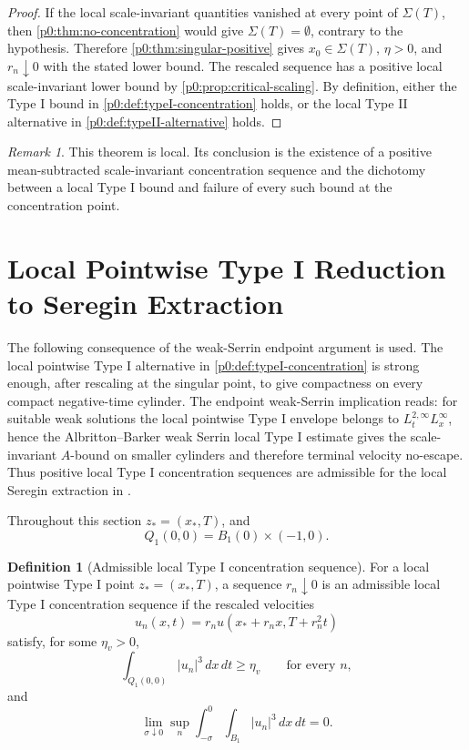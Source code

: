 \documentclass[11pt]{amsart}
\theoremstyle{plain}
\theoremstyle{definition}
\newtheorem{definition}[definition]{Definition}
\theoremstyle{remark}
\newtheorem{remark}[remark]{Remark}
\numberwithin{equation}{section}
\begin{document}
\begin{proof}
If the local scale-invariant quantities vanished at every point of
\(\Sigma(T)\), then \cref{p0:thm:no-concentration} would give
\(\Sigma(T)=\emptyset\), contrary to the hypothesis.  Therefore
\cref{p0:thm:singular-positive} gives
\(x_0\in\Sigma(T)\), \(\eta>0\), and \(r_n\downarrow0\) with the stated lower
bound.  The rescaled sequence has a positive local scale-invariant lower bound
by \cref{p0:prop:critical-scaling}.  By definition, either the Type I bound in
\cref{p0:def:typeI-concentration} holds, or the local Type II alternative in
\cref{p0:def:typeII-alternative} holds.
\end{proof}

\begin{remark}
This theorem is local.  Its conclusion is the existence of a positive
mean-subtracted scale-invariant concentration sequence and the dichotomy
between a local Type I bound and failure of every such bound at the
concentration point.
\end{remark}

\section{Local Pointwise Type I Reduction to Seregin Extraction}
\label{p0:sec:local-typeI-terminal-reduction-paper0}

The following consequence of the weak-Serrin endpoint argument is used.
The local pointwise Type I alternative in
\cref{p0:def:typeI-concentration} is strong enough, after rescaling at the singular
point, to give compactness on every compact negative-time cylinder.  The
endpoint weak-Serrin implication reads:
for suitable weak solutions the local pointwise Type I envelope belongs to
\(L^{2,\infty}_tL^\infty_x\), hence the Albritton--Barker weak Serrin local
Type I estimate gives the scale-invariant \(A\)-bound on smaller cylinders and
therefore terminal velocity no-escape.  Thus positive local Type I
concentration sequences are admissible for the local Seregin extraction in
.

Throughout this section \(z_*=(x_*,T)\), and
\[
  Q_1(0,0)=B_1(0)\times(-1,0).
\]

\begin{definition}[Admissible local Type I concentration sequence]
\label{p0:def:paper0-admissible-local-typeI-sequence}
For a local pointwise Type I point \(z_*=(x_*,T)\), a sequence
\(r_n\downarrow0\) is an admissible local Type I concentration sequence if the rescaled
velocities
\[
  u_n(x,t)=r_nu(x_*+r_nx,T+r_n^2t)
\]
satisfy, for some \(\eta_v>0\),
\[
   \int_{Q_1(0,0)} |u_n|^3\,dx\,dt\ge\eta_v
   \qquad\text{for every }n,
\]
and
\[
   \lim_{\sigma\downarrow0}
   \sup_n
   \int_{-\sigma}^{0}\int_{B_1}|u_n|^3\,dx\,dt=0 .
\]
\end{definition}
\end{document}

